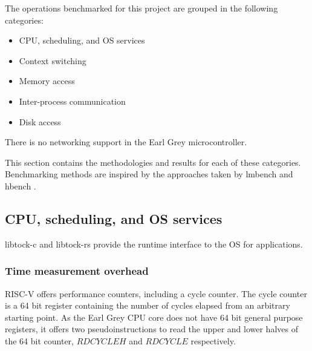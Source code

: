 \documentclass{article}
\begin{document}
The operations benchmarked for this project are grouped in the following categories:

\begin{itemize}
    \item CPU, scheduling, and OS services
    \item Context switching
    \item Memory access
    \item Inter-process communication
    \item Disk access
\end{itemize}

There is no networking support in the Earl Grey microcontroller.

This section contains the methodologies and results for each of these categories. Benchmarking methods are inspired by the approaches taken by lmbench \cite{lmbench} and hbench \cite{hbench}.


\subsection{CPU, scheduling, and OS services}

libtock-c and libtock-rs provide the runtime interface to the OS for applications. 

\subsubsection{Time measurement overhead} \label{subsubsec:time-measurement}

RISC-V offers performance counters, including a cycle counter. The cycle counter is a 64 bit register containing the number of cycles elapsed from an arbitrary starting point. As the Earl Grey CPU core does not have 64 bit general purpose registers, it offers two pseudoinstructions to read the upper and lower halves of the 64 bit counter, $RDCYCLEH$ and $RDCYCLE$ respectively.
\end{document}
